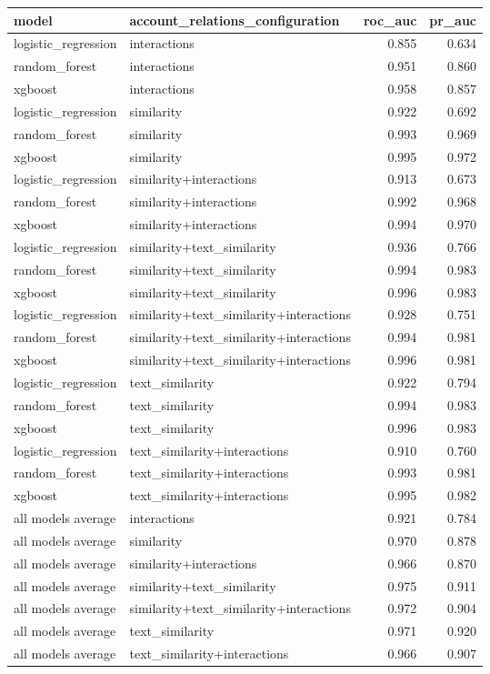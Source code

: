 \begin{tabular}{llrr}
\toprule
model & account\_relations\_configuration & roc\_auc & pr\_auc \\
\midrule
logistic\_regression & interactions & 0.855 & 0.634 \\
random\_forest & interactions & 0.951 & 0.860 \\
xgboost & interactions & 0.958 & 0.857 \\
logistic\_regression & similarity & 0.922 & 0.692 \\
random\_forest & similarity & 0.993 & 0.969 \\
xgboost & similarity & 0.995 & 0.972 \\
logistic\_regression & similarity+interactions & 0.913 & 0.673 \\
random\_forest & similarity+interactions & 0.992 & 0.968 \\
xgboost & similarity+interactions & 0.994 & 0.970 \\
logistic\_regression & similarity+text\_similarity & 0.936 & 0.766 \\
random\_forest & similarity+text\_similarity & 0.994 & 0.983 \\
xgboost & similarity+text\_similarity & 0.996 & 0.983 \\
logistic\_regression & similarity+text\_similarity+interactions & 0.928 & 0.751 \\
random\_forest & similarity+text\_similarity+interactions & 0.994 & 0.981 \\
xgboost & similarity+text\_similarity+interactions & 0.996 & 0.981 \\
logistic\_regression & text\_similarity & 0.922 & 0.794 \\
random\_forest & text\_similarity & 0.994 & 0.983 \\
xgboost & text\_similarity & 0.996 & 0.983 \\
logistic\_regression & text\_similarity+interactions & 0.910 & 0.760 \\
random\_forest & text\_similarity+interactions & 0.993 & 0.981 \\
xgboost & text\_similarity+interactions & 0.995 & 0.982 \\
all models average & interactions & 0.921 & 0.784 \\
all models average & similarity & 0.970 & 0.878 \\
all models average & similarity+interactions & 0.966 & 0.870 \\
all models average & similarity+text\_similarity & 0.975 & 0.911 \\
all models average & similarity+text\_similarity+interactions & 0.972 & 0.904 \\
all models average & text\_similarity & 0.971 & 0.920 \\
all models average & text\_similarity+interactions & 0.966 & 0.907 \\
\bottomrule
\end{tabular}
